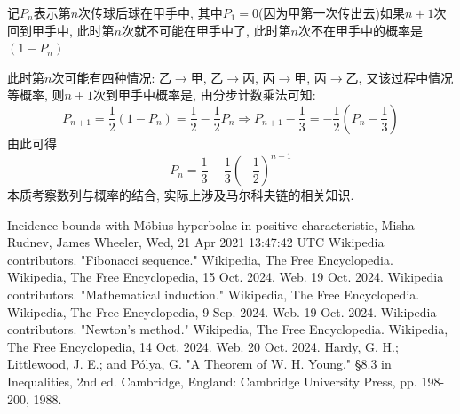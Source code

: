 \documentclass{book}
\begin{document}
    记$P_n$表示第$n$次传球后球在甲手中, 其中$P_1=0$(因为甲第一次传出去)如果$n+1$次回到甲手中, 此时第$n$次就不可能在甲手中了, 此时\textcolor[rgb]{0.75,0.17,0.22}{第$n$次不在甲手中的概率是$(1-P_n)$}

    此时第$n$次可能有四种情况: 乙$\rightarrow$甲, 乙$\rightarrow$丙, 丙$\rightarrow$甲, 丙$\rightarrow$乙, 又该过程中情况等概率, 则$n+1$次到甲手中概率是, 由分步计数乘法可知:$$P_{n+1}=\frac{1}{2}\left( 1-P_n \right)=\frac{1}{2}-\frac{1}{2}P_n\Longrightarrow P_{n+1}-\frac{1}{3}=-\frac{1}{2}\left( P_n-\frac{1}{3} \right)$$由此可得$$P_n=\frac{1}{3}-\frac{1}{3}\left( -\frac{1}{2} \right)^{n-1}$$
    本质考察数列与概率的结合, 实际上涉及\textcolor[rgb]{0.38,0.11,0.2}{马尔科夫链}的相关知识. 

    \begin{thebibliography}{99}
        Incidence bounds with Möbius hyperbolae in positive characteristic, Misha Rudnev, James Wheeler, Wed, 21 Apr 2021 13:47:42 UTC
        Wikipedia contributors. "Fibonacci sequence." Wikipedia, The Free Encyclopedia. Wikipedia, The Free Encyclopedia, 15 Oct. 2024. Web. 19 Oct. 2024.
        Wikipedia contributors. "Mathematical induction." Wikipedia, The Free Encyclopedia. Wikipedia, The Free Encyclopedia, 9 Sep. 2024. Web. 19 Oct. 2024.
        Wikipedia contributors. "Newton's method." Wikipedia, The Free Encyclopedia. Wikipedia, The Free Encyclopedia, 14 Oct. 2024. Web. 20 Oct. 2024.
        Hardy, G. H.; Littlewood, J. E.; and Pólya, G. "A Theorem of W. H. Young." §8.3 in Inequalities, 2nd ed. Cambridge, England: Cambridge University Press, pp. 198-200, 1988.
    \end{thebibliography}
\end{document}
